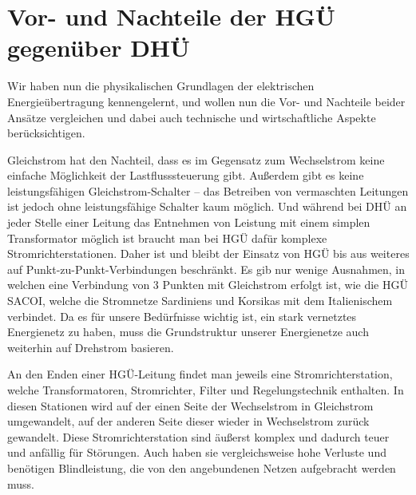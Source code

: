 \section{Vor- und Nachteile der HGÜ gegenüber DHÜ}
Wir haben nun die physikalischen Grundlagen der elektrischen Energieübertragung kennengelernt, und wollen nun die Vor- und Nachteile beider Ansätze vergleichen und dabei auch technische und wirtschaftliche Aspekte berücksichtigen.

Gleichstrom hat den Nachteil, dass es im Gegensatz zum Wechselstrom keine einfache Möglichkeit der Lastflusssteuerung gibt.
Außerdem gibt es keine leistungsfähigen Gleichstrom-Schalter -- das Betreiben von vermaschten Leitungen ist jedoch ohne leistungsfähige Schalter kaum möglich.\cite{Schymroch} 
Und während bei DHÜ an jeder Stelle einer Leitung das Entnehmen von Leistung mit einem simplen Transformator möglich ist braucht man bei HGÜ dafür komplexe Stromrichterstationen.\cite{Schymroch}
Daher ist und bleibt der Einsatz von HGÜ bis aus weiteres auf Punkt-zu-Punkt-Verbindungen beschränkt. Es gib nur wenige Ausnahmen, in welchen eine Verbindung von 3 Punkten mit Gleichstrom erfolgt ist, wie die HGÜ SACOI, welche die Stromnetze Sardiniens und Korsikas mit dem Italienischem verbindet.
Da es für unsere Bedürfnisse wichtig ist, ein stark vernetztes Energienetz zu haben, muss die Grundstruktur %
unserer Energienetze auch weiterhin auf Drehstrom basieren.

An den Enden einer HGÜ-Leitung findet man jeweils eine Stromrichterstation, welche Transformatoren, Stromrichter, Filter und Regelungstechnik enthalten.\cite{Schymroch} In diesen Stationen wird auf der einen Seite der Wechselstrom in Gleichstrom umgewandelt, auf der anderen Seite dieser wieder in Wechselstrom zurück gewandelt.
Diese Stromrichterstation sind äußerst komplex und dadurch teuer und anfällig für Störungen. Auch haben sie vergleichsweise hohe Verluste und benötigen Blindleistung, die von den angebundenen Netzen aufgebracht werden muss.

